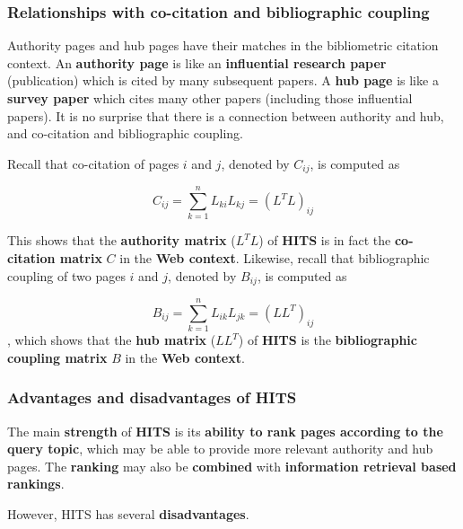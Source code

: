 \subsubsection{Relationships with co-citation and bibliographic coupling}

Authority pages and hub pages have their matches in the bibliometric citation context. An \textbf{authority page} is like an \textbf{influential research paper} (publication) which is cited by many subsequent papers. A \textbf{hub page} is like a \textbf{survey paper} which cites many other papers (including those influential papers). It is no surprise that there is a connection between authority and hub, and co-citation and bibliographic coupling. 

Recall that co-citation of pages $i$ and $j$, denoted by $C_{ij}$, is computed as 

$$
C_{ij} = \sum_{k = 1}^n L_{ki} L_{kj} = (L^TL)_{ij}
$$

This shows that the \textbf{authority matrix} ($L^TL$) of \textbf{HITS} is in fact the \textbf{co-citation matrix} $C$ in the \textbf{Web context}. Likewise, recall that bibliographic coupling of two pages $i$ and $j$, denoted by $B_{ij}$, is computed as 

$$
B_{ij} = \sum_{k = 1}^n L_{ik} L_{jk} = (LL^T)_{ij}
$$
, which shows that the \textbf{hub matrix} ($LL^T$) of \textbf{HITS} is the \textbf{bibliographic coupling matrix} $B$ in the \textbf{Web context}.

\subsubsection{Advantages and disadvantages of HITS}
The main \textbf{strength} of \textbf{HITS} is its \textbf{ability to rank pages according to the query topic}, which may be able to provide more relevant authority and hub pages. The \textbf{ranking} may also be \textbf{combined} with \textbf{information retrieval based rankings}. 

However, HITS has several \textbf{disadvantages}.

